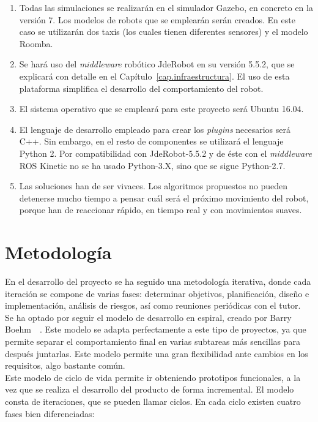 \begin{enumerate}[1.]
\item Todas las simulaciones se realizarán en el simulador Gazebo, en concreto en la versión 7. Los modelos de robots que se emplearán serán creados. En este caso se utilizarán dos taxis (los cuales tienen diferentes sensores) y el modelo Roomba.
\item Se hará uso del \textit{middleware} robótico JdeRobot en su versión 5.5.2, que se explicará con detalle en el Capítulo~\ref{cap.infraestructura}. El uso de esta plataforma simplifica el desarrollo del comportamiento del robot. 
\item El sistema operativo que se empleará para este proyecto será Ubuntu 16.04.
\item El lenguaje de desarrollo empleado para crear los \textit{plugins} necesarios será C++. Sin embargo, en el resto de componentes se utilizará el lenguaje Python 2. Por compatibilidad con JdeRobot-5.5.2 y de éste con el \textit{middleware} ROS Kinetic no se ha usado Python-3.X, sino que se sigue Python-2.7.
\item Las soluciones han de ser vivaces. Los algoritmos propuestos no pueden detenerse mucho tiempo a pensar cuál será el próximo movimiento del robot, porque han de reaccionar rápido, en tiempo real y con movimientos suaves.
\end{enumerate}

\section{Metodología}
En el desarrollo del proyecto se ha seguido una metodología iterativa, donde cada iteración se compone de varias fases: determinar objetivos, planificación, diseño e implementación, análisis de riesgos, así como reuniones periódicas con el tutor.\\

Se ha optado por seguir el modelo de desarrollo en espiral, creado por Barry Boehm~\cite{modelo_espiral}~\cite{modelo_espiral1}. Este modelo se adapta perfectamente a este tipo de proyectos, ya que permite separar el comportamiento final en varias subtareas más sencillas para después juntarlas. Este modelo permite una gran flexibilidad ante cambios en los requisitos, algo bastante común.\\

Este modelo de ciclo de vida permite ir obteniendo prototipos funcionales, a la vez que se realiza el desarrollo del producto de forma incremental. El modelo consta de iteraciones, que se pueden llamar ciclos. En cada ciclo existen cuatro fases bien diferenciadas:

